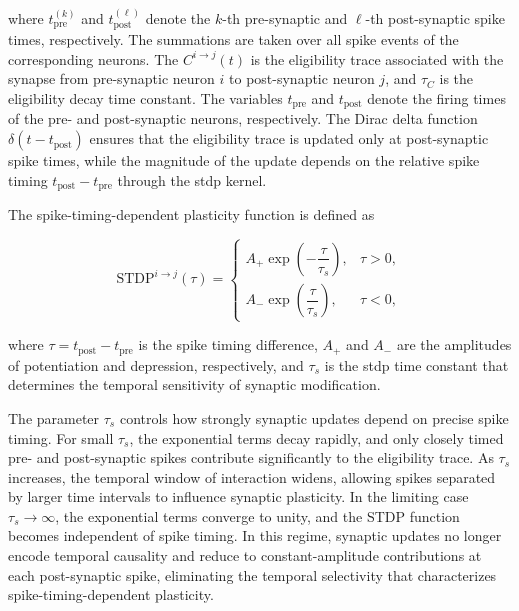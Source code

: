 \noindent

where \(t_{\text{pre}}^{(k)}\) and \(t_{\text{post}}^{(\ell)}\) denote the \(k\)-th pre-synaptic and \(\ell\)-th post-synaptic spike times, respectively. The summations are taken over all spike events of the corresponding neurons. The $C^{i\rightarrow j}(t)$ is the eligibility trace associated with the synapse from pre-synaptic neuron $i$ to post-synaptic neuron $j$, and $\tau_C$ is the eligibility decay time constant. The variables $t_{\text{pre}}$ and $t_{\text{post}}$ denote the firing times of the pre- and post-synaptic neurons, respectively. The Dirac delta function $\delta(t - t_{\text{post}})$ ensures that the eligibility trace is updated only at post-synaptic spike times, while the magnitude of the update depends on the relative spike timing $t_{\text{post}} - t_{\text{pre}}$ through the \ac{stdp} kernel.

The spike-timing-dependent plasticity function is defined as

\begin{equation} \label{Eq.15}
    \text{STDP}^{i\rightarrow j}(\tau) =
    \begin{cases}
        A_{+}\exp\!\left(-\dfrac{\tau}{\tau_s}\right), & \tau > 0, \\
        A_{-}\exp\!\left(\dfrac{\tau}{\tau_s}\right),  & \tau < 0,
    \end{cases}
\end{equation}

\noindent
where $\tau = t_{\text{post}} - t_{\text{pre}}$ is the spike timing difference, $A_{+}$ and $A_{-}$ are the amplitudes of potentiation and depression, respectively, and $\tau_s$ is the \ac{stdp} time constant that determines the temporal sensitivity of synaptic modification.

The parameter $\tau_s$ controls how strongly synaptic updates depend on precise spike timing. For small $\tau_s$, the exponential terms decay rapidly, and only closely timed pre- and post-synaptic spikes contribute significantly to the eligibility trace. As $\tau_s$ increases, the temporal window of interaction widens, allowing spikes separated by larger time intervals to influence synaptic plasticity. In the limiting case $\tau_s \rightarrow \infty$, the exponential terms converge to unity, and the STDP function becomes independent of spike timing. In this regime, synaptic updates no longer encode temporal causality and reduce to constant-amplitude contributions at each post-synaptic spike, eliminating the temporal selectivity that characterizes spike-timing-dependent plasticity.



